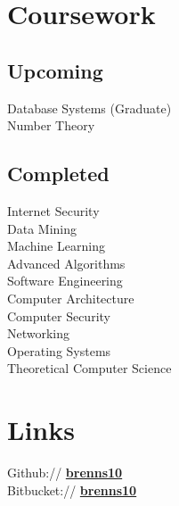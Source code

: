 \documentclass[letterpaper]{deedy-resume} %
\newcommand{\bul}{\textbullet{}}
\begin{document}
\begin{minipage}[t]{0.33\textwidth}
\sectionspace %


\section{Coursework}

\subsection{Upcoming}

Database Systems (Graduate) \\%
Number Theory

\sectionspace %


\subsection{Completed}

Internet Security \\%
Data Mining \\%
Machine Learning \\%
Advanced Algorithms \\%
Software Engineering \\%
Computer Architecture \\%
Computer Security \\%
Networking \\%
Operating Systems \\%
Theoretical Computer Science


\sectionspace %


\section{Links}

Github:// \href{https://github.com/brenns10}{\bf brenns10} \\
Bitbucket:// \href{https://bitbucket.org/brenns10}{\bf brenns10} \\

\sectionspace %


\end{minipage}
\end{document}
